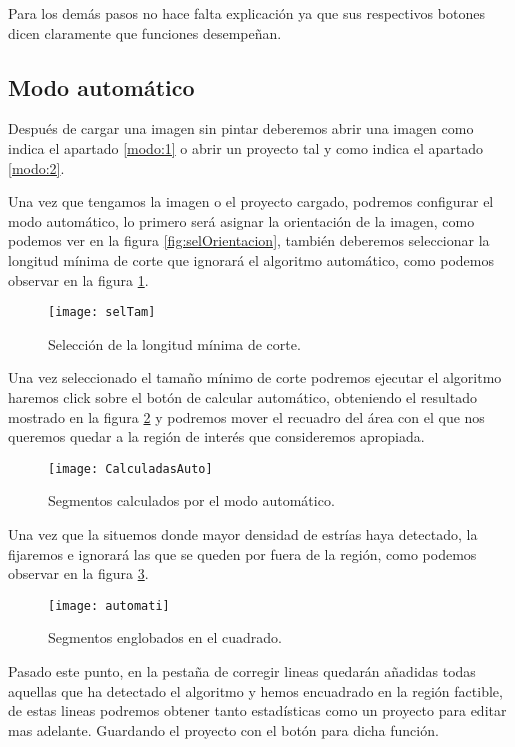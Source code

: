 	
Para los demás pasos no hace falta explicación ya que sus respectivos botones dicen claramente que funciones desempeñan.	
	
\subsection{Modo automático}
Después de cargar una imagen sin pintar deberemos abrir una imagen como indica el apartado \ref{modo:1} o abrir un proyecto tal y como indica el apartado \ref{modo:2}.

Una vez que tengamos la imagen o el proyecto cargado, podremos configurar el modo automático, lo primero será asignar la orientación de la imagen, como podemos ver en la figura \ref{fig:selOrientacion}, también deberemos seleccionar la longitud mínima de corte que ignorará el algoritmo automático, como podemos observar en la figura \ref{fig:selTam}.

\begin{figure}[h]
\centering
\texttt{[image: selTam]}
\caption{Selección de la longitud mínima de corte.}
\label{fig:selTam}
\end{figure}

Una vez seleccionado el tamaño mínimo de corte podremos ejecutar el algoritmo haremos click sobre el botón de calcular automático, obteniendo el resultado mostrado en la figura \ref{fig:CalculadasAuto} y podremos mover el recuadro del área con el que nos queremos quedar a la región de interés que consideremos apropiada.

\begin{figure}[h]
\centering
\texttt{[image: CalculadasAuto]}
\caption{Segmentos calculados por el modo automático.}
\label{fig:CalculadasAuto}
\end{figure}

Una vez que la situemos donde mayor densidad de estrías haya detectado, la fijaremos e ignorará las que se queden por fuera de la región, como podemos observar en la figura \ref{fig:automati}.

\begin{figure}[h]
\centering
\texttt{[image: automati]}
\caption{Segmentos englobados en el cuadrado.}
\label{fig:automati}
\end{figure}

Pasado este punto, en la pestaña de corregir lineas quedarán añadidas todas aquellas que ha detectado el algoritmo y hemos encuadrado en la región factible, de estas lineas podremos obtener tanto estadísticas como un proyecto para editar mas adelante. Guardando el proyecto con el botón para dicha función.

